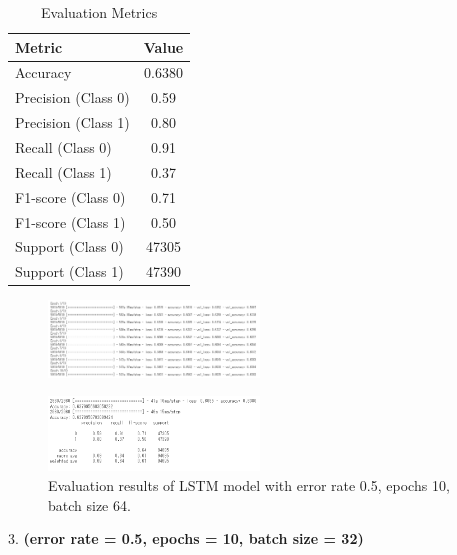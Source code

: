 \begin{table}[h!]
\centering
\caption{Evaluation Metrics}
\label{tab:evaluation_metrics}
\begin{tabular}{|l|c|}
\hline
\textbf{Metric} & \textbf{Value} \\
\hline
Accuracy        & 0.6380 \\
\hline
Precision (Class 0)       & 0.59 \\
\hline
Precision (Class 1)       & 0.80 \\
\hline
Recall (Class 0)       & 0.91 \\
\hline
Recall (Class 1)       & 0.37 \\
\hline
F1-score (Class 0)       & 0.71 \\
\hline
F1-score (Class 1)       & 0.50 \\
\hline
Support (Class 0)       & 47305 \\
\hline
Support (Class 1)       & 47390 \\
\hline
\end{tabular}
\end{table}

\begin{figure}[h!]
    \centering
    \includegraphics[width=0.5\textwidth]{Figures/1-ER50_epoch10_batch64.png}
    \label{fig:lstm_results_0.5_10_64-1}
\end{figure}
\begin{figure}[h!]
    \centering
    \includegraphics[width=0.5\textwidth]{Figures/2-ER50_epoch10_batch64.png}
    \caption{Evaluation results of LSTM model with error rate 0.5, epochs 10, batch size 64.}
    \label{fig:lstm_results_0.5_10_64-2}
\end{figure}

\vspace{100pt}

3. \textbf{(error rate = 0.5, epochs = 10, batch size = 32)}

